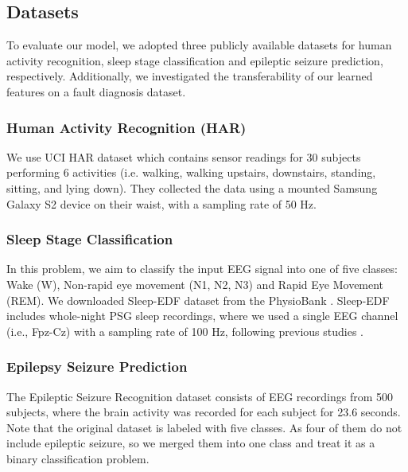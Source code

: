 \documentclass{article}
\begin{document}
\subsection{Datasets}
To evaluate our model, we adopted three publicly available datasets for human activity recognition, sleep stage classification and epileptic seizure prediction, respectively. Additionally, we investigated the transferability of our learned features on a fault diagnosis dataset. 


\subsubsection{Human Activity Recognition (HAR)}
We use UCI HAR dataset \cite{anguita2013public} which contains sensor readings for 30 subjects performing 6 activities (i.e. walking, walking upstairs, downstairs, standing, sitting, and lying down). They collected the data using a mounted Samsung Galaxy S2 device on their waist, with a sampling rate of 50 Hz.


\subsubsection{Sleep Stage Classification}
In this problem, we aim to classify the input EEG signal into one of five classes:  Wake (W), Non-rapid eye movement (N1, N2, N3) and Rapid Eye Movement (REM).
We downloaded Sleep-EDF dataset from the PhysioBank \cite{goldberger2000physiobank}. Sleep-EDF includes whole-night PSG sleep recordings, where we used a single EEG channel (i.e., Fpz-Cz) with a sampling rate of 100 Hz, following previous studies \cite{attnSleep_paper}.

\subsubsection{Epilepsy Seizure Prediction}
The Epileptic Seizure Recognition dataset \cite{PhysRevE.64.061907} consists of EEG recordings from 500 subjects, where the brain activity was recorded for each subject for 23.6 seconds. Note that the original dataset is labeled with five classes. As four of them do not include epileptic seizure, so we merged them into one class and treat it as a binary classification problem. 


\begin{table}[]
\centering
{}
\caption{Description of datasets used in our experiments. The details of FD is the same for all the 4 working conditions.}
\label{tab:data}
\end{table} 
\end{document}
